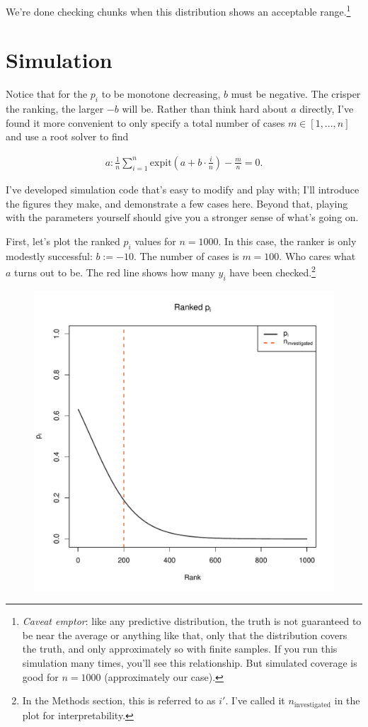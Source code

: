 \documentclass{article}
\begin{document}
We're done checking chunks when this distribution shows an acceptable range.\footnote{ \textit{Caveat emptor}: like any predictive distribution, the truth is not guaranteed to be near the average or anything like that, only that the distribution covers the truth, and only approximately so with finite samples. If you run this simulation many times, you'll see this relationship. But simulated coverage is good for $n=1000$ (approximately our case).}

\newpage
\section{Simulation}

Notice that for the $p_i$ to be monotone decreasing, $b$ must be negative. The crisper the ranking, the larger $-b$ will be. Rather than think hard about $a$ directly, I've found it more convenient to only specify a total number of cases $m\in [1, ..., n]$ and use a root solver to find

\begin{align}
a: \frac{1}{n}\sum_{i=1}^n\text{expit}\left(a+b\cdot \frac{i}{n}\right) - \frac{m}{n} = 0.
\end{align}

I've developed simulation code that's easy to modify and play with; I'll introduce the figures they make, and demonstrate a few cases here. Beyond that, playing with the parameters yourself should give you a stronger sense of what's going on.

First, let's plot the ranked $p_i$ values for $n=1000$. In this case, the ranker is only modestly successful: $b:=-10$. The number of cases is $m=100$. Who cares what $a$ turns out to be. The red line shows how many $y_i$ have been checked.\footnote{In the Methods section, this is referred to as $i'$. I've called it $n_{\text{investigated}}$ in the plot for interpretability.}

\begin{figure}[!htb]
    \centering
    \includegraphics[width=.85\textwidth, trim=0cm 0cm 1cm .5cm, clip]{ranked_rankbad.pdf}
        \label{fig:figure1}
\end{figure}
\end{document}
